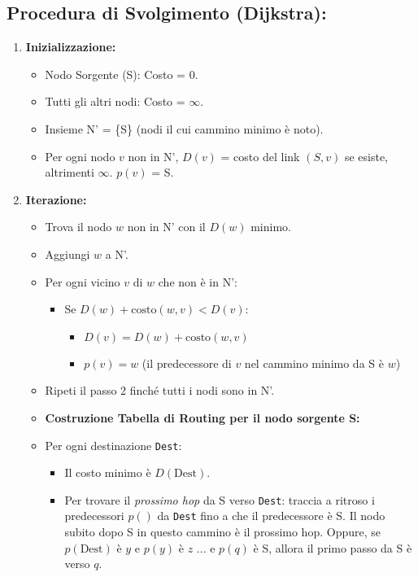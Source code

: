 \subsection{Procedura di Svolgimento (Dijkstra):}
\begin{enumerate}
    \item \textbf{Inizializzazione:}
    \begin{itemize}
        \item Nodo Sorgente (S): Costo = 0.
        \item Tutti gli altri nodi: Costo = $\infty$.
        \item Insieme N' = \{S\} (nodi il cui cammino minimo è noto).
        \item Per ogni nodo $v$ non in N', $D(v)$ = costo del link $(S,v)$ se esiste, altrimenti $\infty$. $p(v)$ = S.
    \end{itemize}
    \item \textbf{Iterazione:}
    \begin{itemize}
        \item Trova il nodo $w$ non in N' con il $D(w)$ minimo.
        \item Aggiungi $w$ a N'.
        \item Per ogni vicino $v$ di $w$ che non è in N':
        \begin{itemize}
            \item Se $D(w) + \text{costo}(w,v) < D(v)$:
            \begin{itemize}
                \item $D(v) = D(w) + \text{costo}(w,v)$
                \item $p(v) = w$ (il predecessore di $v$ nel cammino minimo da S è $w$)
            \end{itemize}
        \end{itemize}
    \item Ripeti il passo 2 finché tutti i nodi sono in N'.
    \item \textbf{Costruzione Tabella di Routing per il nodo sorgente S:}
        \item Per ogni destinazione \texttt{Dest}:
        \begin{itemize}
            \item Il costo minimo è $D(\text{Dest})$.
            \item Per trovare il \textit{prossimo hop} da S verso \texttt{Dest}: traccia a ritroso i predecessori $p()$ da \texttt{Dest} fino a che il predecessore è S. Il nodo subito dopo S in questo cammino è il prossimo hop. Oppure, se $p(\text{Dest})$ è $y$ e $p(y)$ è $z$ ... e $p(q)$ è S, allora il primo passo da S è verso $q$.
        \end{itemize}
    \end{itemize}
\end{enumerate}


